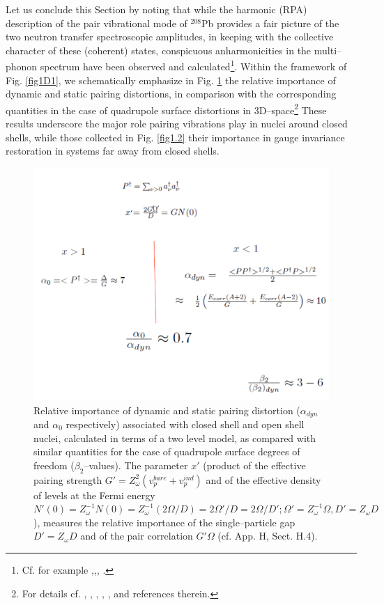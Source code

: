 Let us conclude this Section by noting that while the harmonic (RPA) description of the pair vibrational mode of $^{208}$Pb provides a fair picture of the two neutron transfer spectroscopic amplitudes, in keeping with the collective character of these (coherent) states, conspicuous anharmonicities in the multi--phonon spectrum have been observed and calculated\footnote{Cf. for example \cite{Flynn:72},\cite{Lanford:73},\cite{Bortignon:78}, \cite{Clark:06}.}. Within the framework of Fig. \ref{fig1D1}, we schematically emphasize in Fig. \ref{fig1_E8} the relative importance of dynamic and static pairing distortions, in comparison with the corresponding quantities in the case of quadrupole surface distortions in 3D--space\footnote{For details cf. \cite{Bes:77}, \cite{Broglia:68}, \cite{Bes:88},\cite{Barranco:87a} \cite{Shimizu:89}, \cite{Shimizu:13}, \cite{Vaquero:13} and references therein.}  These results underscore the major role pairing vibrations play in nuclei around closed shells, while those collected in Fig. \ref{fig1.2} their importance in gauge invariance restoration in systems far away from closed shells.
  \begin{figure}
  \centerline{\includegraphics*[width=\textwidth,angle=0]{nutshell/figs/fig1E8.pdf}}
  \caption{Relative importance of dynamic and static pairing distortion ($\alpha_{dyn}$ and $\alpha_0$ respectively) associated with closed shell and open shell  nuclei, calculated in terms of a two level model, as compared with similar quantities for the case of quadrupole surface degrees of freedom ($\beta_2$--values). The parameter $x'$ (product of the effective pairing strength $G'=Z_\omega^2(v_p^{bare}+v_p^{ind})$ and of the effective density of levels at the Fermi energy $N'(0)=Z_\omega^{-1}N(0)=Z^{-1}_\omega(2\Omega/D)=2\Omega'/D=2\Omega/D';\Omega'=Z_\omega^{-1}\Omega,D'=Z_\omega D$), measures the relative importance of the single--particle gap $D'=Z_\omega D$ and of the pair correlation $G'\Omega$ (cf. \cite{Brink:05} App. H, Sect. H.4).}\label{fig1_E8}
  \end{figure}
